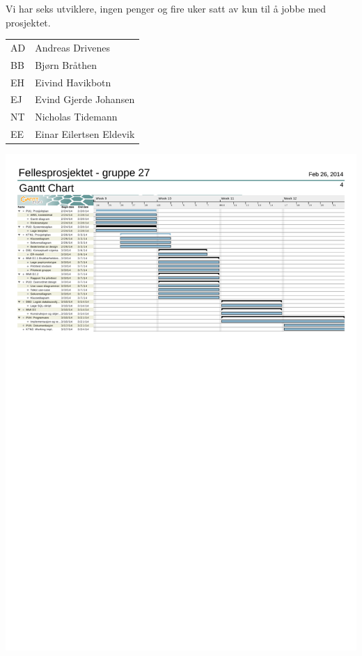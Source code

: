 
Vi har seks utviklere, ingen penger og fire uker satt av kun til å jobbe med prosjektet.



\begin{table}
 \centering
	\begin{tabular}{l l}
	AD & Andreas Drivenes\\
	BB & Bjørn Bråthen\\
	EH & Eivind Havikbotn\\
	EJ & Evind Gjerde Johansen\\
	NT & Nicholas Tidemann\\
	EE & Einar Eilertsen Eldevik\\
	\end{tabular}

\end{table}
\begin{landscape}
\centerline{\includegraphics[clip=true]{gantt_tidsoversikt.pdf}}
\end{landscape}